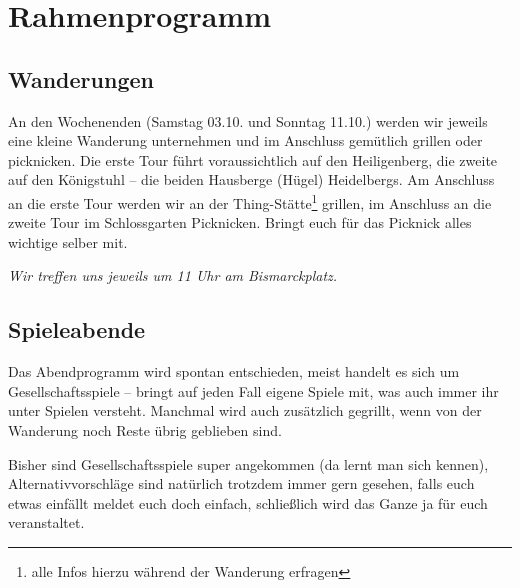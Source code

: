 \section{Rahmenprogramm}
\subsection{Wanderungen}
An den Wochenenden (Samstag 03.10. und Sonntag 11.10.) werden wir jeweils eine
kleine Wanderung unternehmen und im Anschluss gemütlich grillen oder
picknicken. Die erste Tour führt voraussichtlich auf den Heiligenberg, die
zweite auf den Königstuhl -- die beiden Hausberge (Hügel) Heidelbergs. Am
Anschluss an die erste Tour werden wir an der Thing-Stätte\footnote{alle Infos
hierzu während der Wanderung erfragen} grillen, im Anschluss an die zweite Tour
im Schlossgarten Picknicken.  Bringt euch für das Picknick alles wichtige
selber mit.

\noindent\emph{Wir treffen uns jeweils um 11 Uhr am Bismarckplatz.}

\subsection{Spieleabende}
Das Abendprogramm wird spontan entschieden, meist handelt es sich um Gesellschaftsspiele -- bringt auf jeden Fall eigene Spiele mit, was auch immer ihr unter Spielen versteht. Manchmal wird auch zusätzlich gegrillt, wenn von der Wanderung noch Reste übrig geblieben sind.

Bisher sind Gesellschaftsspiele super angekommen (da lernt man sich kennen), Alternativvorschläge sind natürlich trotzdem immer gern gesehen, falls euch etwas einfällt meldet euch doch einfach, schließlich wird das Ganze ja für euch veranstaltet.


\iffalse
